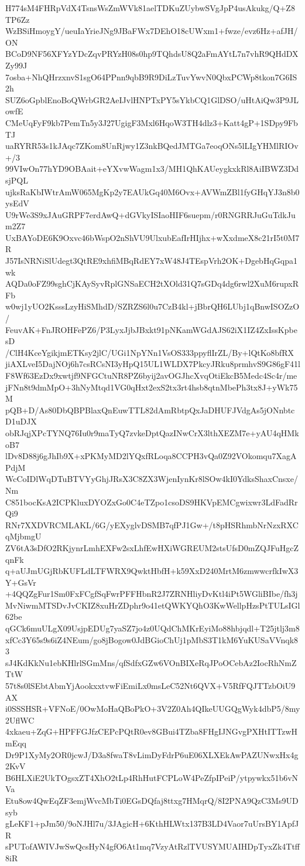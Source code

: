 H774sM4FHRpVdX4TsnsWsZmWVk81aelTDKuZUybwSVgJpP4usAkukg/Q+Z8TP6Zz
WzBSiHmoygY/ueuIaYrieJNg9JBaFWx7DEhO18cUWxm1+fwze/evz6Hz+afJH/ON
BCoD9NF56XFYzYDcZqvPRYzH08s0hp9TQhdsU8Q2aFmAYtL7n7vhR9QHdDXZy99J
7osba+NhQHrzxnvS1sgO64PPnn9qbB9R9DiLzTuvYwvN0QbxPCWp8tkon7G6IS2h
SUZ6oGpblEnoBoQWrbGR2AeIJvlHNPTxPY5sYkbCQ1GlDSO/uHtAiQw3P9JLowfE
CMeUqFyF9kb7PemTn5y3J27UgigF3Mxl6HqoW3TH4dlz3+Katt4gP+1SDpy9FbTJ
uaRYRR53s1kJAqc7ZKom8UnRjwy1Z3nkBQedJMTGa7eoqONs5lLIgYHMlRIOv+/3
99VIwOn77hYD9OBAait+eYXvwWagm1x3/MH1QhKAUeygkxkRl8AiIBWZ3DdsjPQL
ujksRaKbIWtrAmW065MgKp2y7EAUkGq40M6Ovx+AVWmZBl1fyGHqYJ3n8b0ysEdV
U9rWe3S9xJAuGRPF7erdAwQ+dGVkyISIaoHIF6suepm/r0RNGRRJuGuTdkJum2Z7
UxBAYoDE6K9Oxvc46bWspO2nShVU9UlxubEafIrHIjhx+wXxdmeX8c21rI5t0M7R
J57IsNRNiSlUdegt3QtRE9xhfiMBqRdEY7xW48J4TEspVrh2OK+DgebHqGqpa1wk
AQDa0oFZ99sghCjKAySyvRplGNSaECH2tXOld31Q7sGDq4dg6rwl2XuM6rupxRFb
w0wj1yUO2KsssLzyHiSMhdD/SZRZS6l0u7CzB4kl+jBbrQH6LUbj1qBnwISOZzO/
FeuvAK+FnJROHFePZ6/P3LyxJjbJBxkt91pNKamWGdAJS62iX1IZ4ZxIssKpbesD
/ClH4KceYgikjmETKsy2jlC/UGi1NpYNn1VsOS333ppyflIrZL/By+lQtKo8bfRX
jiAXLveI5DajNOj6h7csRCsNI3yHpQ15UL1WLDX7PkcyJRku8prmhvS9G86gF41l
F8Wf63EzDx9xwtjf9NFGCtuNR8PZ6byij2avOGJhcXvqOtiEkcB5Medc4Sc4r/me
jFNn8t9dmMpO+3hNyMtqd1VG0qHxt2exS2tx3rt4hsb8qtnMbePh3tx8J+yWk75M
pQB+D/As80DbQBPBlaxQnEuwTTL82dAmRbtpQxJaDHUFJVdgAs5jONnbtcD1uDJX
obRJqjXPcTYNQ76Iu0r9maTyQ7zvkeDptQazINwCrX3lthXEZM7e+yAU4qHMkoB7
lDv8D88j6gJhIb9X+xPKMyMD2lYQxfRLoqa8CCPH3vQa0Z92VOkomqu7XagAPdjM
WcCoIDlWqDTuBTVYyGhjJRsX3C8ZX3WjenIynKr8lSOw4kI0YdksShaxCnsxe/Nm
C851bocKsA2ICPKluxDYOZxGo0C4eTZpo1csoDS9HKVpEMCgwixwr3LdFadRrQi9
RNr7XXDVRCMLAKL/6G/yEXyglvDSMB7qfPJ1Gw+/t8pHSRhmbNrNzxRXCqMjbmgU
ZV6tA3sDfO2RKjynrLmhEXFw2sxLhfEwHXiWGREUM2stsUfsD0mZQJFuHgcZqnFk
q+aUJmUGjRbKUFLdLTFWRX9QwktHbfH+k59XxD240MrtM6zmwwcrfkIwX3Y+GsVr
+4QQZgFur1Sm0FxFCgfSqFwrPFFHbnR2J7ZRNHliyDvKtl4iPt5WGliBIbe/fh3j
MvNiwmMTSDvJvCKIZ8xuHrZDphr9o41etQWKYQhO3KwWellpHzsPtTULsIGl62be
qGCk6muULgX09UsjpEDUg7yaSZ7jo4z0UQdChMKrEyiMo88hbjqdl+T25jtlj3m8
xfCc3Y65s9s6iZ4NEum/go8jBogow0JdBGioChUj1pMbS3T1kM6YuKUSaVVnqk83
sJ4KdKkNu1ebKHlrlSGmMns/qfSdfxGZw6VOnBIXeRqJPoOCebAz2IocRhNmZTtW
57t8s0lSEbtAbmYjAookxxtvwFiEmiLx0msLeC52Nt6QVX+V5RfFQJTTzbOiU9AX
i0SSSHSR+VFNoE/0OwMoHaQBoPkO+3V2Z0Ah4QIkeUUGQgWyk4dbP5/8my2UflWC
4xkaeu+ZqG+HPFFGJfzCEPcPQtR0ev8GBui4TZba8FHgIJNGvgPXHtITTzwHmEqq
Dr9P1XyMy2OR0jcwJ/D3a8fwaT8vLimDyFdrP6uE06XLXEkAwPAZUNwxHx4g2KvV
B6HLXiE2UkTOgsxZT4XhO2tLp4RhHutFCPLoW4PeZfpIPeiP/ytpywkx51b6vNVa
Etu8ow4QwEqZF3emjWvcMbTi0EGsDQfaj8ttxg7HMqrQ/8I2PNA9QzC3Ms9UDsyb
gLeKF1+pJm50/9oNJHl7u/3JAgicH+6KthHLWtx137B3LD4Vaor7uUrsBY1ApfJR
sPUTofAWIVJwSwQcsHyN4gfO6At1mq7VzyAtRzlTVUSYMUAIHDpTyxZk4Ttff8iR
